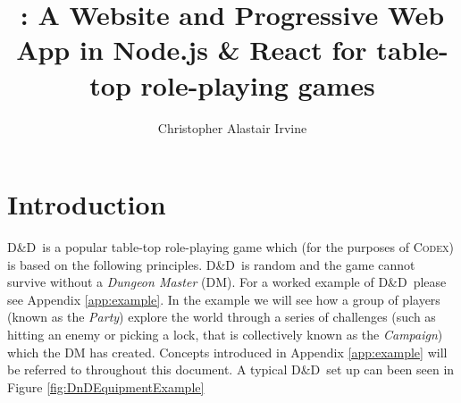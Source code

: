 \documentclass[progress]{cmpreport}
\title{\Codex: A Website and Progressive Web App in Node.js \& React for table-top role-playing games}
\author{Christopher Alastair Irvine}
\newcommand{\dnd}{D\&D}
\newcommand{\Codex}{\textsc{Codex}}
\begin{document}
	\section{Introduction} \label{sec:intro}
	\dnd \ is a popular table-top role-playing game which (for the purposes of \Codex) is based on the following principles. \dnd \ is random and the game cannot survive without a \emph{Dungeon Master} (DM). For a worked example of \dnd \ please see Appendix \ref{app:example}. In the example we will see how a group of players (known as the \emph{Party}) explore the world through a series of challenges (such as hitting an enemy or picking a lock, that is collectively known as the \emph{Campaign}) which the DM has created. Concepts introduced in Appendix \ref{app:example} will be referred to throughout this document. A typical \dnd \ set up can been seen in Figure \ref{fig:DnDEquipmentExample}
	
\end{document}
